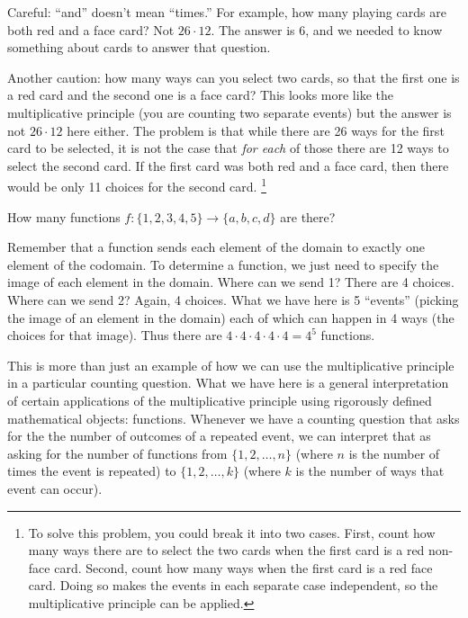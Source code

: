 \documentclass[11pt,]{book}
\theoremstyle{ptxplainnotitle}
\theoremstyle{ptxplaintitle}
\theoremstyle{ptxdefinitionnotitle}
\theoremstyle{ptxdefinitiontitle}
\theoremstyle{ptxdefinitionnotitle}
\theoremstyle{ptxdefinitiontitle}
\theoremstyle{ptxdefinitionnotitle}
\theoremstyle{ptxdefinitiontitle}
\theoremstyle{ptxdefinitiontitlenonumber}
\theoremstyle{ptxdefinitiontitlenonumber}
\numberwithin{equation}{chapter}
\begin{document}
\hypertarget{p-1007}{}%
Careful: ``and'' doesn't mean ``times.'' For example, how many playing cards are both red and a face card? Not \(26 \cdot 12\). The answer is 6, and we needed to know something about cards to answer that question.%
\par
\hypertarget{p-1008}{}%
Another caution: how many ways can you select two cards, so that the first one is a red card and the second one is a face card? This looks more like the multiplicative principle (you are counting two separate events) but the answer is not \(26 \cdot 12\) here either. The problem is that while there are 26 ways for the first card to be selected, it is not the case that \emph{for each} of those there are 12 ways to select the second card. If the first card was both red and a face card, then there would be only 11 choices for the second card. \footnote{To solve this problem, you could break it into two cases. First, count how many ways there are to select the two cards when the first card is a red non-face card. Second, count how many ways when the first card is a red face card. Doing so makes the events in each separate case independent, so the multiplicative principle can be applied.\label{fn-5}}%
\begin{example}\label{example-counting-functions-all}
\hypertarget{p-1009}{}%
How many functions \(f:\{1,2,3,4,5\} \to \{a,b,c,d\}\) are there?%
\par\smallskip%
\noindent\textbf{}\hypertarget{solution-140}{}\hypertarget{p-1010}{}%
Remember that a function sends each element of the domain to exactly one element of the codomain.  To determine a function, we just need to specify the image of each element in the domain.  Where can we send 1?  There are 4 choices.  Where can we send 2?  Again, 4 choices.  What we have here is 5 ``events'' (picking the image of an element in the domain) each of which can happen in 4 ways (the choices for that image).  Thus there are \(4 \cdot 4 \cdot 4 \cdot 4 \cdot 4 = 4^5\) functions.%
\par
\hypertarget{p-1011}{}%
This is more than just an example of how we can use the multiplicative principle in a particular counting question.  What we have here is a general interpretation of certain applications of the multiplicative principle using rigorously defined mathematical objects: functions.  Whenever we have a counting question that asks for the the number of outcomes of a repeated event, we can interpret that as asking for the number of functions from \(\{1,2,\ldots, n\}\) (where \(n\) is the number of times the event is repeated) to  \(\{1,2,\ldots,k\}\) (where \(k\) is the number of ways that event can occur).%
\end{example}
\typeout{************************************************}
\typeout{************************************************}
\end{document}
